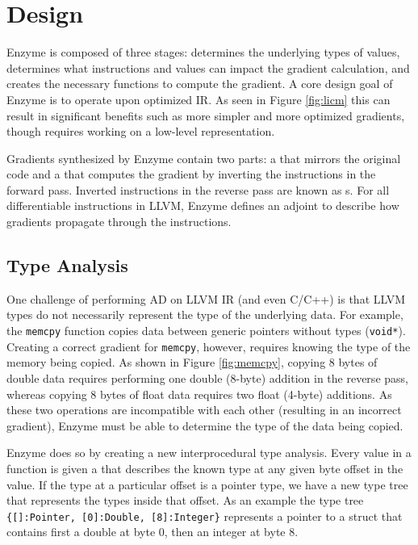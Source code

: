 \section{Design}
\label{sec:design}

Enzyme is composed of three stages:  determines the underlying types of values,  determines what instructions and values can impact the gradient calculation, and  creates the necessary functions to compute the gradient. A core design goal of Enzyme is to operate upon optimized IR. As seen in Figure \ref{fig:licm} this can result in significant benefits such as more simpler and more optimized gradients, though requires working on a low-level representation.

Gradients synthesized by Enzyme contain two parts: a  that mirrors the original code and a  that computes the gradient by inverting the instructions in the forward pass. Inverted instructions in the reverse pass are known as s. For all differentiable instructions in LLVM, Enzyme defines an adjoint to describe how gradients propagate through the instructions.

\subsection{Type Analysis}
One challenge of performing AD on LLVM IR (and even C/C++) is that LLVM types do not necessarily represent the type of the underlying data. For example, the \texttt{memcpy} function copies data between generic pointers without types (\texttt{void*}). Creating a correct gradient for \texttt{memcpy}, however, requires knowing the type of the memory being copied. As shown in Figure \ref{fig:memcpy}, copying 8 bytes of double data requires performing one double (8-byte) addition in the reverse pass, whereas copying 8 bytes of float data requires two float (4-byte) additions. As these two operations are incompatible with each other (resulting in an incorrect gradient), Enzyme must be able to determine the type of the data being copied.

Enzyme does so by creating a new interprocedural type analysis. Every value in a function is given a  that describes the known type at any given byte offset in the value. If the type at a particular offset is a pointer type, we have a new type tree that represents the types inside that offset. As an example the type tree \verb|{[]:Pointer, [0]:Double, [8]:Integer}| represents a pointer to a struct that contains first a double at byte 0, then an integer at byte 8.

